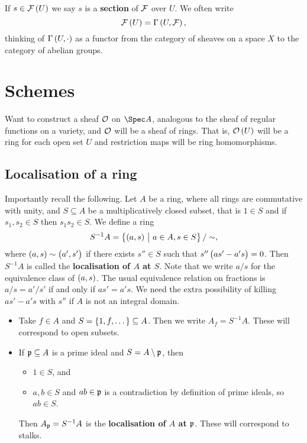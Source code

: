 \begin{remark*}
If $ s \in \FFF\br{U} $ we say $ s $ is a \textbf{section} of $ \mathcal{F} $ over $ U $. We often write
$$ \FFF\br{U} = \Gamma\br{U, \FFF}, $$
thinking of $ \Gamma\br{U, \cdot} $ as a functor from the category of sheaves on a space $ X $ to the category of abelian groups.
\end{remark*}

\pagebreak

\section{Schemes}

Want to construct a sheaf $ \mathcal{O} $ on $ \Spec A $, analogous to the sheaf of regular functions on a variety, and $ \mathcal{O} $ will be a sheaf of rings. That is, $ \OOO\br{U} $ will be a ring for each open set $ U $ and restriction maps will be ring homomorphisms.

\subsection{Localisation of a ring}

Importantly recall the following. Let $ A $ be a ring, where all rings are commutative with unity, and $ S \subseteq A $ be a multiplicatively closed subset, that is $ 1 \in S $ and if $ s_1, s_2 \in S $ then $ s_1s_2 \in S $. We define a ring
$$ S^{-1}A = \cbr{\br{a, s} \st a \in A, s \in S} / \sim, $$
where $ \br{a, s} \sim \br{a', s'} $ if there exists $ s'' \in S $ such that $ s''\br{as' - a's} = 0 $. Then $ S^{-1}A $ is called the \textbf{localisation of $ A $ at $ S $}. Note that we write $ a / s $ for the equivalence class of $ \br{a, s} $. The usual equivalence relation on fractions is $ a / s = a' / s' $ if and only if $ as' = a's $. We need the extra possibility of killing $ as' - a's $ with $ s'' $ if $ A $ is not an integral domain.

\begin{example*}
\hfill
\begin{itemize}
\item Take $ f \in A $ and $ S = \cbr{1, f, \dots} \subseteq A $. Then we write $ A_f = S^{-1}A $. These will correspond to open subsets.
\item If $ \mathfrak{p} \subseteq A $ is a prime ideal and $ S = A \setminus \mathfrak{p} $, then
\begin{itemize}
\item $ 1 \in S $, and
\item $ a, b \in S $ and $ ab \in \mathfrak{p} $ is a contradiction by definition of prime ideals, so $ ab \in S $.
\end{itemize}
Then $ A_{\mathfrak{p}} = S^{-1}A $ is the \textbf{localisation of $ A $ at $ \mathfrak{p} $}. These will correspond to stalks.
\end{itemize}
\end{example*}

